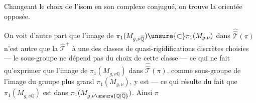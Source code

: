 


Changeant le choix de l'isom en son complexe conjugué, on trouve la   orientée opposée.

On voit d'autre part que l'image de $\pi_1(M_{g,\nu\overline{\mathbb Q}})\unsure{\subset}\pi_1(M_{g,\nu})$ dans $\widehat{\widehat{\mathcal T}}(\pi)$ n'est autre que la $\widehat{\mathcal T}^{+}$  à une  des classes de quasi-rigidifications discrètes choisies --- le sous-groupe ne dépend pas du choix de cette classe --- ce qui ne fait qu'exprimer que l'image de $\pi_1(M_{g,\nu\overline{\mathbb Q}})$ dans $\widehat{\widehat{\mathcal T}}(\pi)$,  comme sous-groupe de l'image du groupe plus grand $\pi_1(M_{g,\nu})$, y est  --- ce qui résulte du fait que $\pi_1(M_{g,\nu\overline{\mathbb Q}})$ est  dans $\pi_1(M_{g,\nu\unsure{\mathbb Q|\overline{\mathbb Q}}})$. Ainsi $\pi$

